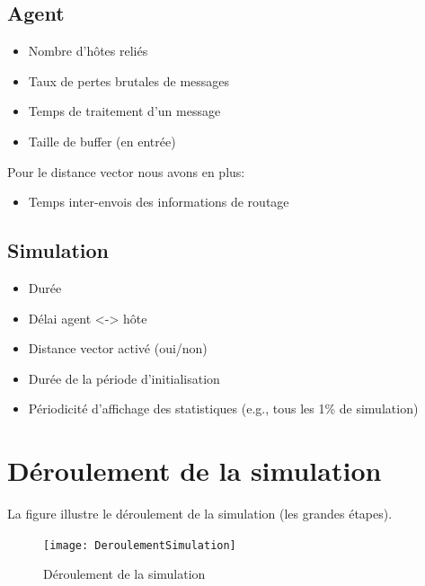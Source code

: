 \documentclass[a4paper,11pt]{article}
\begin{document}
\subsection{Agent}

\begin{itemize}
 \item Nombre d'hôtes reliés
 \item Taux de pertes brutales de messages
 \item Temps de traitement d'un message
 \item Taille de buffer (en entrée)
\end{itemize}

Pour le distance vector nous avons en plus:
\begin{itemize}
 \item Temps inter-envois des informations de routage
\end{itemize}

\subsection{Simulation}
\begin{itemize}
 \item Durée
 \item Délai agent <-> hôte
 \item Distance vector activé (oui/non)
 \item Durée de la période d'initialisation
 \item Périodicité d'affichage des statistiques (e.g., tous les 1\% de simulation)
\end{itemize}









\section{Déroulement de la simulation}
La figure  illustre le déroulement de la simulation (les grandes étapes).

\begin{figure}[h!t]
  \centering
    \texttt{[image: DeroulementSimulation]}
  \caption{Déroulement de la simulation}
  \label{fig:deroulement-simulation}
\end{figure}
\end{document}
